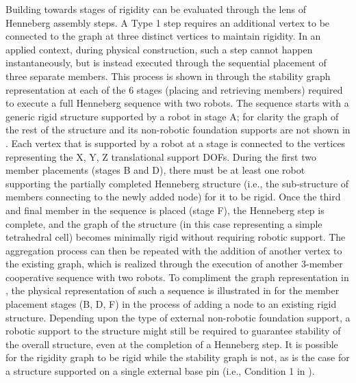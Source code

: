     Building towards stages of rigidity can be evaluated through the lens of Henneberg assembly steps. A Type 1 step requires an additional vertex to be connected to the graph at three distinct vertices to maintain rigidity. In an applied context, during physical construction, such a step cannot happen instantaneously, but is instead executed through the sequential placement of three separate members. This process is shown in  through the stability graph representation at each of the 6 stages (placing and retrieving members) required to execute a full Henneberg sequence with two robots. The sequence starts with a generic rigid structure supported by a robot in stage A; for clarity the graph of the rest of the structure and its non-robotic foundation supports are not shown in . Each vertex that is supported by a robot at a stage is connected to the vertices representing the X, Y, Z translational support DOFs. During the first two member placements (stages B and D), there must be at least one robot supporting the partially completed Henneberg structure (i.e., the sub-structure of members connecting to the newly added node) for it to be rigid. Once the third and final member in the sequence is placed (stage F), the Henneberg step is complete, and the graph of the structure (in this case representing a simple tetrahedral cell) becomes minimally rigid without requiring robotic support. The aggregation process can then be repeated with the addition of another vertex to the existing graph, which is realized through the execution of another 3-member cooperative sequence with two robots. To compliment the graph representation in , the physical representation of such a sequence is illustrated in  for the member placement stages (B, D, F) in the process of adding a node to an existing rigid structure. Depending upon the type of external non-robotic foundation support, a robotic support to the structure might still be required to guarantee stability of the overall structure, even at the completion of a Henneberg step. It is possible for the rigidity graph to be rigid while the stability graph is not, as is the case for a structure supported on a single external base pin (i.e., Condition 1 in ).  
    
